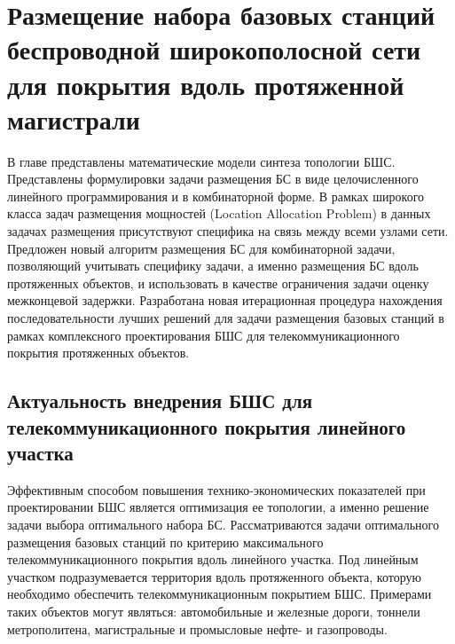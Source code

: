 \chapter{Размещение набора базовых станций беспроводной широкополосной сети для покрытия вдоль протяженной магистрали}\label{chapter_linear_network}

В главе представлены математические модели синтеза топологии БШС. Представлены формулировки задачи размещения БС в виде целочисленного линейного программирования и в комбинаторной форме. В рамках широкого класса задач размещения мощностей (Location Allocation Problem) в данных задачах размещения присутствуют специфика на связь между всеми узлами сети. Предложен новый алгоритм размещения БС для комбинаторной задачи, позволяющий учитывать специфику задачи, а именно размещения БС вдоль протяженных объектов, и использовать в качестве ограничения задачи оценку межконцевой задержки. Разработана новая итерационная процедура нахождения последовательности лучших решений для задачи размещения базовых станций в рамках комплексного проектирования БШС для телекоммуникационного покрытия протяженных объектов. 


\section{Актуальность внедрения БШС для телекоммуникационного покрытия линейного участка}


Эффективным способом повышения технико-экономических показателей при проектировании БШС является оптимизация ее топологии, а именно решение задачи выбора оптимального набора БС. Рассматриваются задачи оптимального размещения базовых станций по критерию максимального телекоммуникационного покрытия вдоль линейного участка. Под линейным участком подразумевается территория вдоль протяженного объекта, которую необходимо обеспечить телекоммуникационным покрытием БШС. Примерами таких объектов могут являться: автомобильные и железные дороги, тоннели метрополитена, магистральные и промысловые нефте- и газопроводы. 

